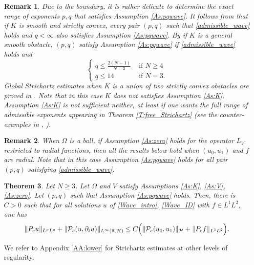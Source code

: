 \documentclass[10pt,leqno]{amsart}
\newtheorem{theorem}{Theorem}[section]
\newtheorem{remark}[theorem]{Remark}
\theoremstyle{definition}%
\theoremstyle{remark}
\numberwithin{equation}{section}
\newcommand{\R}{\mathbb{R}}
\renewcommand{\^}{\widehat}%
\newcommand{\HHH}{\mathcal{H}}
\newcommand{\PPP}{\mathcal{P}}
\begin{document}
\begin{remark}
\label{R:pqwave}
Due to the boundary, it is rather delicate to determine the exact range of exponents $p,q$ that satisfies Assumption \ref{As:pqwave}. It follows from 
\cite{SmithSogge95} that if $K$ is smooth and strictly convex, every pair $(p,q)$ such that \eqref{admissible_wave} holds and $q<\infty$ also satisfies Assumption \ref{As:pqwave}. By \cite{BSS} if $K$ is a general smooth obstacle, $(p,q)$ satisfy Assumption \ref{As:pqwave} if \eqref{admissible_wave} holds and
\begin{equation}
	\label{condition_BSS}
	\begin{cases}
	q\le \frac{2(N-1)}{N-3}&\text{ if }N\geq 4\\
	q\le 14&\text{ if }N=3.
	\end{cases}
	\end{equation}
Global Strichartz estimates when $K$ is a union of two strictly convex obstacles are proved in \cite{Lafontaine22}. Note that in this case $K$ does not satisfies Assumption \ref{As:K}. Assumption \ref{As:K} is not sufficient neither, at least if one wants the full range of admissible exponents appearing in Theorem \ref{T:free_Strichartz} (see the counter-examples in \cite{Ivanovici1}, \cite{Ivanovici2}).
\end{remark}
\begin{remark}
 When $\Omega$ is a ball, if Assumption \ref{As:zero} holds for the operator $L_V$ restricted to radial functions, then all the results below hold when $(u_0,u_1)$ and $f$ are radial. Note that in this case Assumption \ref{As:pqwave} holds for all pair $(p,q)$ satisfying \eqref{admissible_wave}.
\end{remark}


\begin{theorem}
	\label{T:wave}
	Let $N\geq 3$.
	Let $\Omega$ and $V$ satisfy Assumptions \ref{As:K}, \ref{As:V}, \ref{As:zero}. Let $(p,q)$ such that Assumption \ref{As:pqwave} holds. Then, there is $C>0$ such that for all solutions $u$ of \eqref{Wave_intro}, \eqref{Wave_ID} with $f\in  L^{1} L^{2}$, one has 
	\begin{equation}
	\label{eq:strichartz-nonedpt}
	\|P_c u\|_{L^pL^q}+\|\PPP_c(u,\partial_tu)\|_{L^{\infty}(\R,\HHH)}\le C\Bigl(\|\PPP_c(u_0,u_1)\|_{\mathcal{H}}+\|P_c f\|_{L^{1}L^{2}}\Bigr).
	\end{equation}
\end{theorem} 
We refer to Appendix \ref{AA:lower} for Strichartz estimates at other levels of regularity.
\end{document}

